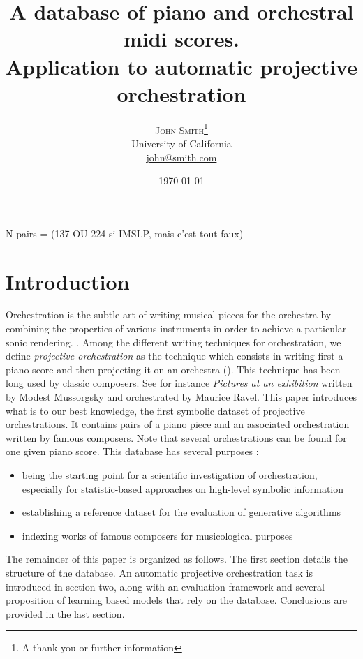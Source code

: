 \documentclass[twoside,twocolumn]{article}
\title{A database of piano and orchestral midi scores.\\Application to automatic projective orchestration} %
\author{%
\textsc{John Smith}\thanks{A thank you or further information} \\[1ex] %
\normalsize University of California \\ %
\normalsize \href{mailto:john@smith.com}{john@smith.com} %
}
\date{\today} %
\begin{document}
\maketitle


N pairs = (137 OU 224 si IMSLP, mais c'est tout faux)



\section{Introduction}
Orchestration is the subtle art of writing musical pieces for the orchestra by combining the properties of various instruments in order to achieve a particular sonic rendering. \cite{koechli_orch,Rimsky-Korsakov:1873aa}. 
Among the different writing techniques for orchestration, we define \textit{projective orchestration} as the technique which consists in writing first a piano score and then projecting it on an orchestra (). This technique has been long used by classic composers.
See for instance \textit{Pictures at an exhibition} written by Modest Mussorgsky and orchestrated by Maurice Ravel.
This paper introduces what is to our best knowledge, the first symbolic dataset of projective orchestrations.
It contains pairs of a piano piece and an associated orchestration written by famous composers. Note that several orchestrations can be found for one given piano score.
This database has several purposes :
\begin{itemize}
	\item being the starting point for a scientific investigation of orchestration, especially for statistic-based approaches on high-level symbolic information
	\item establishing a reference dataset for the evaluation of generative algorithms 
	\item indexing works of famous composers for musicological purposes
\end{itemize}

The remainder of this paper is organized as follows. The first section details the structure of the database. An automatic projective orchestration task is introduced in section two, along with an evaluation framework and several proposition of learning based models that rely on the database.  Conclusions are provided in the last section.
\end{document}
